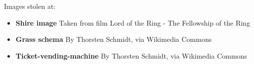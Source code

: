 \begin{frame}{Images stolen at:}
	\tiny
	\begin{itemize}
		\item \textbf{Shire image} Taken from film Lord of the Ring - The Fellowship of the Ring
		\item \textbf{Grass schema} By Thorsten Schmidt, via Wikimedia Commons
		\item \textbf{Ticket-vending-machine} By Thorsten Schmidt, via Wikimedia Commons
	\end{itemize}
	
\end{frame}



